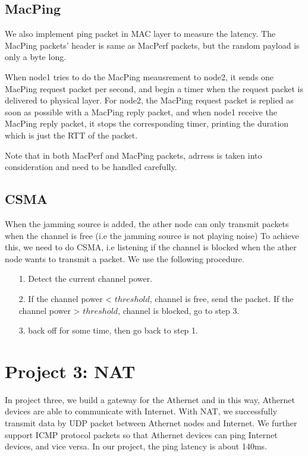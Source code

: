 \documentclass[11pt, conference]{IEEEtran}
\begin{document}
\subsection{MacPing}

We also implement ping packet in MAC layer to measure the latency. The MacPing packets' header is same as MacPerf packets, but the random payload is only a byte long.

When node1 tries to do the MacPing meausrement to node2, it sends one MacPing request packet per second, and begin a timer when the request packet is delivered to physical layer. For node2, the MacPing request packet is replied
as soon as possible with a MacPing reply packet, and when node1 receive the MacPing reply packet, it stops the corresponding timer, printing the duration which is just the RTT of the packet.

Note that in both MacPerf and MacPing packets, adrress is taken into consideration and need to be handled carefully.

\subsection{{CSMA}}
When the jamming source is added, the ather node can only transmit packets when the channel is free (i.e the jamming source is not playing noise)
To achieve this, we need to do CSMA, i.e listening if the channel is blocked when the ather node wants to transmit a packet. We use the following procedure.
\begin{itemize}
    \item[1.] Detect the current channel power.
    \item[2.] If the channel power < $threshold$, channel is free, send the packet. If the channel power > $threshold$, channel is blocked, go to step 3. 
    \item[3.] back off for some time, then go back to step 1.
\end{itemize}

\section{Project 3: NAT}

In project three, we build a gateway for the Athernet and in this way, Athernet devices are able to communicate with Internet. With NAT, we successfully transmit data by UDP packet between Athernet nodes and Internet. 
We further support ICMP protocol packets so that Athernet devices can ping Internet devices, and vice versa. In our project, the ping latency is about 140ms.
\end{document}
